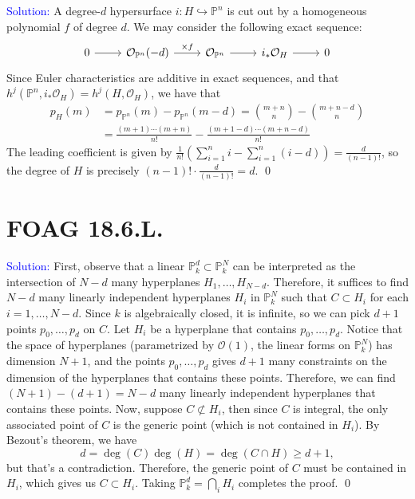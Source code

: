 \documentclass[11pt]{article}
\newcommand{\PP}{\mathbb{P}}
\newcommand{\cO}{\mathcal{O}}
\newenvironment{solution}{\begin{trivlist}\item[]{\textcolor{blue}{Solution:}}}{\qed \end{trivlist}}
\begin{document}
\begin{solution}
    A degree-$d$ hypersurface $i: H \hookrightarrow \PP^n$ is cut out by a homogeneous polynomial $f$ of degree $d$. We may consider the following exact sequence:
    \[\begin{tikzcd}
        0 & {\cO_{\PP^n}(-d)} & {\cO_{\PP^n}} & {i_*\cO_{H}} & 0
        \arrow[from=1-1, to=1-2]
        \arrow["{\times f}", from=1-2, to=1-3]
        \arrow[from=1-3, to=1-4]
        \arrow[from=1-4, to=1-5]
    \end{tikzcd}\]
    Since Euler characteristics are additive in exact sequences, and that $h^j(\PP^n, i_* \cO_H) = h^j (H, \cO_H)$, we have that 
    \begin{align*}
        p_H(m) &= p_{\PP^n}(m) - p_{\PP^n}(m-d) 
        = \binom{m+n}{n} - \binom{m+n-d}{n} \\
        &= \frac{(m+1) \cdots (m+n)}{n!} - \frac{(m+1-d) \cdots (m+n-d)}{n!}
    \end{align*}
    The leading coefficient is given by $\frac{1}{n!} (\sum_{i=1}^n i - \sum_{i=1}^n (i - d)) = \frac{d}{(n-1)!}$, so the degree of $H$ is precisely $(n-1)! \cdot \frac{d}{(n-1)!} = d$. 
\end{solution}

\newpage

\section*{FOAG 18.6.L.}

\begin{solution}
    First, observe that a linear $\PP_k^d \subset \PP_k^N$ can be interpreted as the intersection of $N-d$ many hyperplanes $H_1, \ldots, H_{N-d}$. Therefore, it suffices to find $N-d$ many linearly independent hyperplanes $H_i$ in $\PP_k^N$ such that $C \subset H_i$ for each $i = 1, \ldots, N-d$. Since $k$ is algebraically closed, it is infinite, so we can pick $d+1$ points $p_0, \ldots, p_d$ on $C$. Let $H_i$ be a hyperplane that contains $p_0, \ldots, p_d$. Notice that the space of hyperplanes (parametrized by $\cO(1)$, the linear forms on $\PP_k^N$) has dimension $N+1$, and the points $p_0, \ldots, p_d$ gives $d+1$ many constraints on the dimension of the hyperplanes that contains these points. Therefore, we can find $(N+1) - (d+1) = N-d$ many linearly independent hyperplanes that contains these points. Now, suppose $C \not\subset H_i$, then since $C$ is integral, the only associated point of $C$ is the generic point (which is not contained in $H_i$). By Bezout's theorem, we have 
    \[
        d = \deg(C) \deg(H) = \deg(C \cap H) \geq d+1,
    \]
    but that's a contradiction. Therefore, the generic point of $C$ must be contained in $H_i$, which gives us $C \subset H_i$. Taking $\PP_k^d = \bigcap_i H_i$ completes the proof. 
\end{solution}
\end{document}
